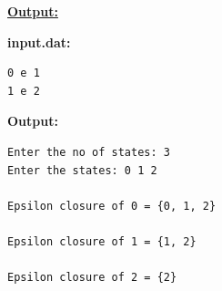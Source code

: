 \documentclass[11pt,a4paper]{article}
\begin{document}
\vspace{0.6em}
\noindent\textbf{\underline{Output:}}\par\vspace{0.4em}
\noindent\textbf{input.dat:}\par\vspace{0.2em}
\begin{lstlisting}
0 e 1
1 e 2
\end{lstlisting}
\vspace{0.4em}
\noindent\textbf{Output:}\par\vspace{0.2em}
\begin{lstlisting}
Enter the no of states: 3
Enter the states: 0 1 2

Epsilon closure of 0 = {0, 1, 2}

Epsilon closure of 1 = {1, 2}

Epsilon closure of 2 = {2}
\end{lstlisting}
\end{document}
